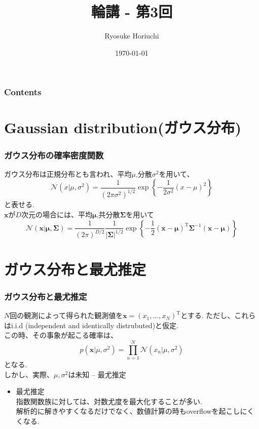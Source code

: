 \documentclass[uplatex,dvipdfmx,11pt,notheorems]{beamer}
\title[略タイトル]{輪講 - 第3回}%
\author[Xaro]{Ryosuke Horiuchi}%
\institute[JPN]{Tokyo, Japan}%
\date{\today}%
\theoremstyle{definition}
\begin{document}
 \begin{frame}[plain]\frametitle{}
 \titlepage %
 \end{frame}

 \begin{frame}\frametitle{Contents}
 \tableofcontents %
 \end{frame}

 \section{Gaussian distribution(ガウス分布)}
 \begin{frame}\frametitle{ガウス分布の確率密度関数}
 ガウス分布は正規分布とも言われ、平均$\mu$,分散$\sigma^{2}$を用いて、
 $$\mathcal{N}\left(x | \mu, \sigma^{2}\right)=\frac{1}{\left(2 \pi \sigma^{2}\right)^{1 / 2}} \exp \left\{-\frac{1}{2 \sigma^{2}}(x-\mu)^{2}\right\}$$
 と表せる.\\
 $\mathbf{x}$が$D$次元の場合には、平均$\boldsymbol{\mu}$,共分散$\mathbf{\Sigma}$を用いて
 $$\mathcal{N}(\mathbf{x} | \boldsymbol{\mu}, \mathbf{\Sigma})=\frac{1}{(2 \pi)^{D / 2}} \frac{1}{|\mathbf{\Sigma}|^{1 / 2}} \exp \left\{-\frac{1}{2}(\mathbf{x}-\boldsymbol{\mu})^{\mathrm{T}} \boldsymbol{\Sigma}^{-1}(\mathbf{x}-\boldsymbol{\mu})\right\}$$
 \end{frame}

\section{ガウス分布と最尤推定}
 \begin{frame}\frametitle{ガウス分布と最尤推定}
	$N$回の観測によって得られた観測値を$\mathbf{x}=\left(x_{1}, \dots, x_{N}\right)^{\mathrm{T}}$とする.
	ただし、これらはi.i.d (independent and identically distrubuted)と仮定.\\
	この時、その事象が起こる確率は、
	$$p\left(\mathbf{x} | \mu, \sigma^{2}\right)=\prod_{n=1}^{N} \mathcal{N}\left(x_{n} | \mu, \sigma^{2}\right)$$
	となる.\\

	しかし、実際、$\mu,\sigma^{2}$は未知 -- 最尤推定
	\begin{itemize}
		\item 最尤推定\\
		指数関数族に対しては、対数尤度を最大化することが多い.\\
		解析的に解きやすくなるだけでなく、数値計算の時もoverflowを起こしにくくなる.
	\end{itemize}
	
 \end{frame}
\end{document}

